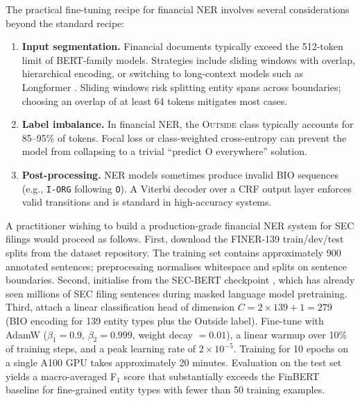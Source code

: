 The practical fine-tuning recipe for financial NER involves several considerations
beyond the standard recipe:

\begin{enumerate}
  \item \textbf{Input segmentation.} Financial documents typically exceed the 512-token
        limit of BERT-family models. Strategies include sliding windows with overlap,
        hierarchical encoding, or switching to long-context models such as Longformer
        \citep{beltagy2020}. Sliding windows risk splitting entity spans across boundaries;
        choosing an overlap of at least 64 tokens mitigates most cases.
  \item \textbf{Label imbalance.} In financial NER, the \textsc{Outside} class typically
        accounts for 85--95\% of tokens. Focal loss or class-weighted cross-entropy can
        prevent the model from collapsing to a trivial ``predict O everywhere'' solution.
  \item \textbf{Post-processing.} NER models sometimes produce invalid BIO sequences
        (e.g., \texttt{I-ORG} following \texttt{O}). A Viterbi decoder over a CRF
        output layer enforces valid transitions and is standard in high-accuracy systems.
\end{enumerate}

\begin{example}
\label{ex:finer-finetuning}
A practitioner wishing to build a production-grade financial NER system for SEC filings
would proceed as follows. First, download the FINER-139 train/dev/test splits from the
dataset repository. The training set contains approximately 900 annotated sentences;
preprocessing normalises whitespace and splits on sentence boundaries. Second, initialise
from the SEC-BERT checkpoint \citep{loukas2022secbert}, which has already seen millions
of SEC filing sentences during masked language model pretraining. Third, attach a
linear classification head of dimension $C = 2 \times 139 + 1 = 279$ (BIO encoding for
139 entity types plus the Outside label). Fine-tune with AdamW ($\beta_1 = 0.9$,
$\beta_2 = 0.999$, weight decay $= 0.01$), a linear warmup over 10\% of training steps,
and a peak learning rate of $2 \times 10^{-5}$. Training for 10 epochs on a single A100
GPU takes approximately 20 minutes. Evaluation on the test set yields a macro-averaged
F$_1$ score that substantially exceeds the FinBERT baseline for fine-grained entity types
with fewer than 50 training examples.
\end{example}

